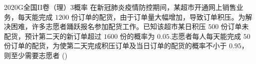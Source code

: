 
\begin{problem}{2020}{G}{全国II卷（理）}{3}{概率}
在新冠肺炎疫情防控期间，某超市开通网上销售业务，每天能完成 $ 1200 $ 份订单的配货，由于订单量大幅增加，导致订单积压。为解决困难，许多志愿者踊跃报名参加配货工作。已知该超市某日积压 $ 500 $ 份订单未配货，预计第二天的新订单超过 $ 1600 $ 份的概率为 $ 0.05 $.志愿者每人每天能完成 $ 50 $ 份订单的配货，为使第二天完成积压订单及当日订单的配货的概率不小于 $ 0.95 $，则至少需要志愿者 (\hspace{1cm})
\begin{choices}
\end{choices}
\end{problem}

\begin{answer}

\end{answer}

\begin{solutions}

\end{solutions}
